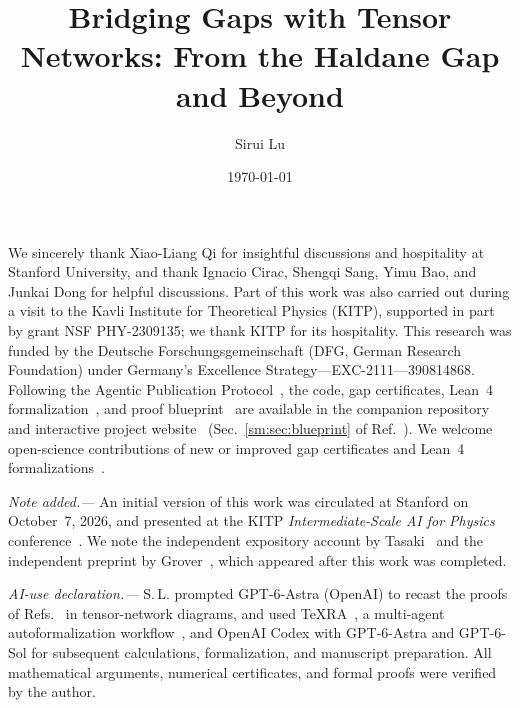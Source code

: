 \documentclass[aps,prl,reprint,floatfix,amsmath,amssymb,nofootinbib]{revtex4-2}
\begin{document}
\title{Bridging Gaps with Tensor Networks: From the Haldane Gap and Beyond}
\author{Sirui Lu}
\date{\today}

\begin{abstract}
    
\end{abstract}
\maketitle
\hideMainFromTOC



\begin{acknowledgments}
    We sincerely thank Xiao-Liang Qi for insightful discussions and hospitality at Stanford
    University, and thank Ignacio Cirac, Shengqi Sang, Yimu Bao, and Junkai Dong for helpful
    discussions. Part of this work was also carried out during a visit to the Kavli Institute for
    Theoretical Physics (KITP), supported in part by grant NSF PHY-2309135; we thank KITP for its
    hospitality. This research was funded by the Deutsche Forschungsgemeinschaft (DFG, German
    Research Foundation) under Germany's Excellence Strategy---EXC-2111---390814868. Following the
    Agentic Publication Protocol~\cite{Lu2026APP}, the code, gap certificates, Lean~4
    formalization~\cite{Lu2026CertifiedGaps}, and proof blueprint~\cite{Lu2026Blueprint} are
    available in the companion repository and interactive project website~\cite{Lu2026Contribute}
    (Sec.~\ref{sm:sec:blueprint} of Ref.~\cite{SM}). We welcome open-science contributions of new
    or improved gap certificates and Lean~4 formalizations~\cite{Lu2026Contribute}.
\end{acknowledgments}

\emph{Note added.---}%
An initial version of this work was circulated at Stanford on
October~7, 2026, and presented at the KITP \emph{Intermediate-Scale AI
    for Physics} conference~\cite{Lu2026Bridging}. We note the independent
expository account by Tasaki~\cite{Tasaki2026Haldane} and the
independent preprint by Grover~\cite{Grover2026Extensions}, which
appeared after this work was completed.

\emph{AI-use declaration.---}%
S.\,L. prompted GPT-6-Astra (OpenAI) to recast the proofs of
Refs.~\cite{OpenAI2026Periodic,OpenAI2026Boundaryfield} in tensor-network diagrams, and
used TeXRA~\cite{TeXRA2025}, a multi-agent autoformalization
workflow~\cite{Lu2026Multiagent,Lu2026TNLean}, and OpenAI Codex with GPT-6-Astra and
GPT-6-Sol for subsequent calculations, formalization, and manuscript preparation. All
mathematical arguments, numerical certificates, and formal proofs were verified by the
author.
\end{document}
